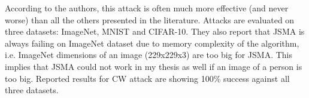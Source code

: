  According to the authors, this attack is often much more effective (and never worse) than all the others presented in the literature. 
Attacks are evaluated on three datasets: ImageNet, MNIST and CIFAR-10. They also report that JSMA is always failing on ImageNet dataset due to memory complexity of the algorithm, i.e. ImageNet dimensions of an image (229x229x3) are too big for JSMA. This implies that JSMA could not work in my thesis as well if an image of a person is too big. Reported results for CW attack are showing 100\% success against all three datasets.
